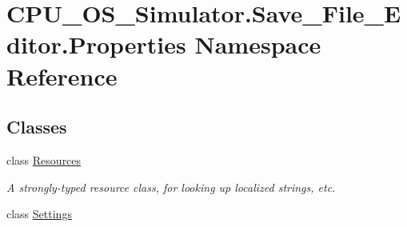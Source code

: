\hypertarget{namespace_c_p_u___o_s___simulator_1_1_save___file___editor_1_1_properties}{}\section{C\+P\+U\+\_\+\+O\+S\+\_\+\+Simulator.\+Save\+\_\+\+File\+\_\+\+Editor.\+Properties Namespace Reference}
\label{namespace_c_p_u___o_s___simulator_1_1_save___file___editor_1_1_properties}
\subsection*{Classes}
\begin{DoxyCompactItemize}
\item 
class \hyperlink{class_c_p_u___o_s___simulator_1_1_save___file___editor_1_1_properties_1_1_resources}{Resources}
\begin{DoxyCompactList}\small\item\em A strongly-\/typed resource class, for looking up localized strings, etc. \end{DoxyCompactList}\item 
class \hyperlink{class_c_p_u___o_s___simulator_1_1_save___file___editor_1_1_properties_1_1_settings}{Settings}
\end{DoxyCompactItemize}
